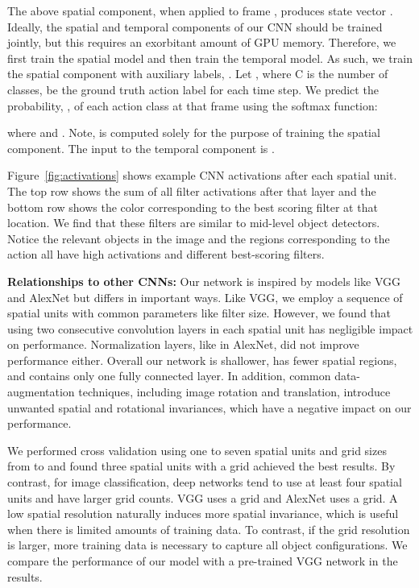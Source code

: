\documentclass[runningheads]{llncs}
\newcommand{\fakesubsection}[1]{\smallskip\noindent\textbf{#1:}}
\begin{document}
The above spatial component, when applied to frame , produces state vector .
Ideally, the spatial and temporal components of our CNN should be trained jointly, but this requires an exorbitant amount of GPU memory. Therefore, we first train the spatial model and then train the temporal model.
As such, we train the spatial component with auxiliary labels, . Let , where C is the number of classes, be the ground truth action label for each time step. We predict the probability, , of each action class at that frame using the softmax function: 

where  and .
Note,  is computed solely for the purpose of training the spatial component. The input to the temporal component is  .

Figure~\ref{fig:activations} shows example CNN activations after each spatial unit. The top row shows the sum of all filter activations after that layer and the bottom row shows the color corresponding to the best scoring filter at that location. We find that these filters are similar to mid-level object detectors. Notice the relevant objects in the image and the regions corresponding to the action all have high activations and different best-scoring filters.






\fakesubsection{Relationships to other CNNs}
Our network is inspired by models like VGG and AlexNet but differs in important ways. Like VGG, we employ a sequence of spatial units with common parameters like filter size. However, we found that using two consecutive convolution layers in each spatial unit has negligible impact on performance. 
Normalization layers, like in AlexNet, did not improve performance either. 
Overall our network is shallower, has fewer spatial regions, and contains only one fully connected layer.
In addition, common data-augmentation techniques, including image rotation and translation, introduce unwanted spatial and rotational invariances, which have a negative impact on our performance. 


We performed cross validation using one to seven spatial units and grid sizes from  to  and found three spatial units with a  grid achieved the best results. 
By contrast, for image classification, deep networks tend to use at least four spatial units and have larger grid counts. VGG uses a  grid and AlexNet uses a  grid. 
A low spatial resolution naturally induces more spatial invariance, which is useful when there is limited amounts of training data.
To contrast, if the grid resolution is larger, more training data is necessary to capture all object configurations.
We compare the performance of our model with a pre-trained VGG network in the results.
\end{document}

